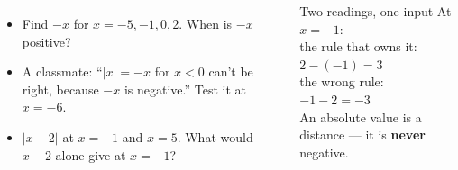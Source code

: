 \documentclass[aspectratio=169, 11pt]{beamer}
\begin{document}
\begin{frame}[t, plain]

  \begin{columns}[T]
      \begin{itemize}\setlength{\itemsep}{7pt}
        \item Find \(-x\) for \(x = -5, -1, 0, 2\). When is \(-x\) positive?
        \item A classmate: ``\(|x| = -x\) for \(x < 0\) can't be right, because \(-x\) is
              negative.'' Test it at \(x = -6\).
        \item \(|x - 2|\) at \(x = -1\) and \(x = 5\). What would \(x - 2\) alone give at
              \(x = -1\)?
      \end{itemize}
      \begin{block}{Two readings, one input}
        At \(x = -1\):\\[3pt]
        the rule that owns it: \(2 - (-1) = 3\)\\[3pt]
        the wrong rule: \(-1 - 2 = -3\)\\[3pt]
        An absolute value is a distance --- it is \textbf{never} negative.
      \end{block}
  \end{columns}
\end{frame}
\end{document}
